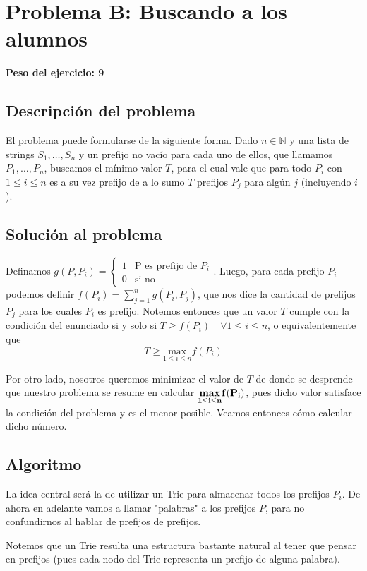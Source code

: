 \newpage{}
\section{Problema B:  Buscando a los alumnos}
\textbf{Peso del ejercicio: 9 }
\subsection{Descripción del problema}
	El problema puede formularse de la siguiente forma. Dado $n \in  \mathbb{N}$ y una lista de strings $S_1, \dots, S_n$ y un prefijo no vacío para cada uno de ellos,  que llamamos $P_1, \dots, P_n$, buscamos el mínimo valor $T$, para el cual vale que para todo $P_i$ con $ 1 \leq i \leq n $ es a su vez prefijo de a lo sumo $T$ prefijos $P_j$ para algún $j$ (incluyendo $i$).
\subsection{Solución al problema}

	Definamos $g(P,P_i) =
\left\{\begin{matrix}
 1 & \text{P es prefijo de } P_i \\ 
 0 & \text{si no}
\end{matrix}\right.$. Luego, para cada prefijo $P_i$ podemos definir $f(P_i) = \sum\limits_{j = 1}^n g(P_i,P_j)$, que nos dice la cantidad de prefijos $P_j$ para los cuales $P_i$ es prefijo. Notemos entonces que un valor $T$ cumple con la condición del enunciado si y solo si $T \geq f(P_i) \quad \forall 1 \leq i \leq n$, o equivalentemente que $$ \boxed{T \geq \underset{1 \leq i \leq n}{\text{max}} f(P_i) }   $$

	Por otro lado, nosotros queremos minimizar el valor de $T$ de donde se desprende que nuestro problema se resume en calcular $\bf \underset{1 \leq i \leq n}{\textbf{max}} f(P_i)$, pues dicho valor satisface la condición del problema y es el menor posible. Veamos entonces cómo calcular dicho número.


\subsection{Algoritmo}

	La idea central será la de utilizar un Trie para almacenar todos los prefijos $P_i$. De ahora en adelante vamos a llamar "palabras" a los prefijos $P$, para no confundirnos al hablar de prefijos de prefijos.
	
	 Notemos que un Trie resulta una estructura bastante natural al tener que pensar en prefijos (pues cada nodo del Trie representa un prefijo de alguna palabra). 
	
